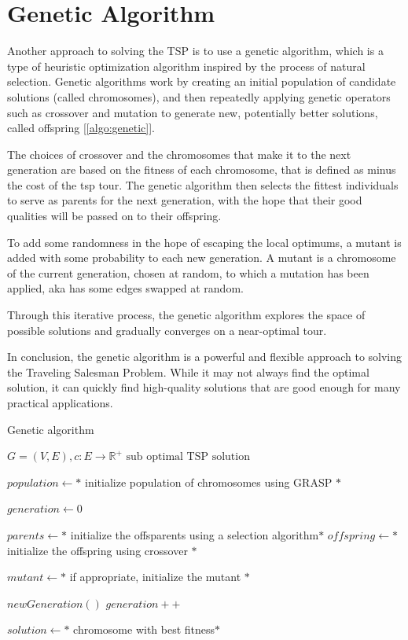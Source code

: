 	




\section{Genetic Algorithm}
Another approach to solving the TSP is to use a genetic algorithm, which is a type of heuristic optimization algorithm inspired by the process of natural selection. Genetic algorithms work by creating an initial population of candidate solutions (called chromosomes), and then repeatedly applying genetic operators such as crossover and mutation to generate new, potentially better solutions, called offspring [\ref{algo:genetic}].


The choices of crossover and the chromosomes that make it to the next generation are based on the fitness of each chromosome, that is defined as minus the cost of the tsp tour. The genetic algorithm then selects the fittest individuals to serve as parents for the next generation, with the hope that their good qualities will be passed on to their offspring.

To add some randomness in the hope of escaping the local optimums, a mutant is added with some probability to each new generation. A mutant is a chromosome of the current generation, chosen at random, to which a mutation has been applied, aka has some edges swapped at random.

Through this iterative process, the genetic algorithm explores the space of possible solutions and gradually converges on a near-optimal tour.

In conclusion, the genetic algorithm is a powerful and flexible approach to solving the Traveling Salesman Problem. While it may not always find the optimal solution, it can quickly find high-quality solutions that are good enough for many practical applications.

\begin{algorithm}
    \caption{Genetic algorithm}\label{algo:genetic}
    \begin{algorithmic}[1]
    \Require $G = (V,E), c:E \to \mathbb{R}^+$
    \Ensure $\text{sub optimal TSP solution}$
    
    \State $population \gets *$ initialize population of chromosomes using GRASP $*$

    \State $ generation \gets 0$


        \State $parents \gets *$ initialize the offsparents  using a selection algorithm$*$
        \State $offspring \gets *$ initialize the offspring using crossover $*$

        \State $mutant \gets *$ if appropriate, initialize the mutant $*$

        \State $ newGeneration() $
        \State $ generation++ $

    \EndWhile

    \State $ solution \gets *$ chromosome with best fitness$*$

    

    \end{algorithmic}
\end{algorithm}

